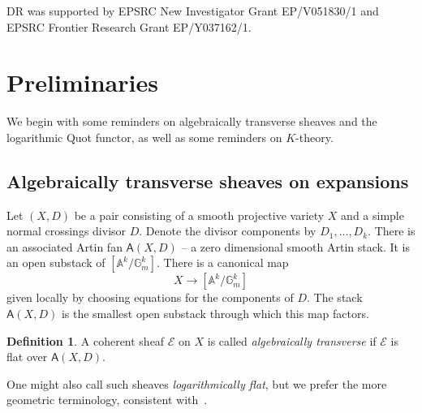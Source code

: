 \documentclass[11pt]{amsart}
\theoremstyle{definition}
\theoremstyle{definition}
\newtheorem{definition}[theorem]{Definition}
\begin{document}
\noindent 
DR was supported by EPSRC New Investigator Grant EP/V051830/1 and EPSRC Frontier Research Grant EP/Y037162/1. 


\section{Preliminaries}\label{sec: prelim}

We begin with some reminders on algebraically transverse sheaves and the logarithmic Quot functor, as well as some reminders on $K$-theory. 

\subsection{Algebraically transverse sheaves on expansions}\label{sec: sheaves-on-expansions} Let $(X,D)$ be a pair consisting of a smooth projective variety $X$ and a simple normal crossings divisor $D$. Denote the divisor components by $D_1,\ldots, D_k$. There is an associated Artin fan $\mathsf A(X,D)$ -- a zero dimensional smooth Artin stack. It is an open substack of $[\mathbb A^k/\mathbb G_m^k]$. There is a canonical map
\[
X\to [\mathbb A^k/\mathbb G_m^k]
\]
given locally by choosing equations for the components of $D$. The stack $\mathsf A(X,D)$ is the smallest open substack through which this map factors. 

\begin{definition}
A coherent sheaf $\mathcal E$ on $X$ is called {\it algebraically transverse} if $\mathcal E$ is flat over $\mathsf A(X,D)$.
\end{definition}

One might also call such sheaves {\it logarithmically flat}, but we prefer the more geometric terminology, consistent with~\cite{MR20}.
\end{document}
